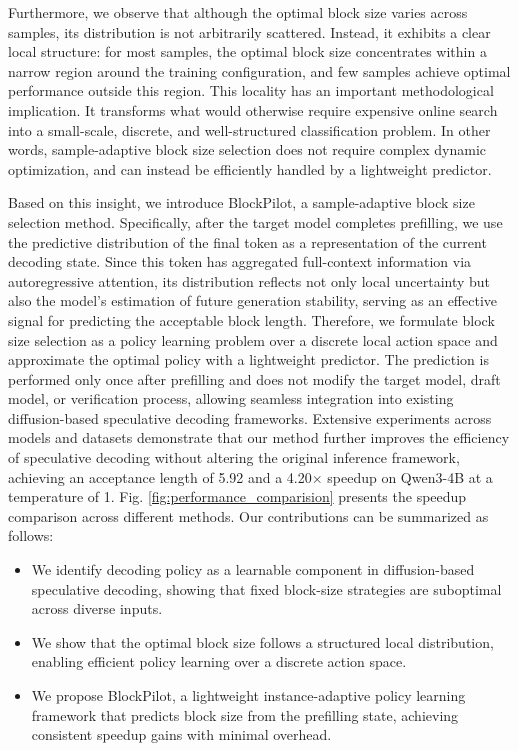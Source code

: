 \documentclass{article}
\begin{document}
Furthermore, we observe that although the optimal block size varies across samples, its distribution is not arbitrarily scattered. Instead, it exhibits a clear local structure: for most samples, the optimal block size concentrates within a narrow region around the training configuration, and few samples achieve optimal performance outside this region. This locality has an important methodological implication. It transforms what would otherwise require expensive online search into a small-scale, discrete, and well-structured classification problem. In other words, sample-adaptive block size selection does not require complex dynamic optimization, and can instead be efficiently handled by a lightweight predictor.

Based on this insight, we introduce BlockPilot, a sample-adaptive block size selection method. Specifically, after the target model completes prefilling, we use the predictive distribution of the final token as a representation of the current decoding state. Since this token has aggregated full-context information via autoregressive attention, its distribution reflects not only local uncertainty but also the model’s estimation of future generation stability, serving as an effective signal for predicting the acceptable block length. Therefore, we formulate block size selection as a policy learning problem over a discrete local action space and approximate the optimal policy with a lightweight predictor. The prediction is performed only once after prefilling and does not modify the target model, draft model, or verification process, allowing seamless integration into existing diffusion-based speculative decoding frameworks. Extensive experiments across models and datasets demonstrate that our method further improves the efficiency of speculative decoding without altering the original inference framework, achieving an acceptance length of 5.92 and a 4.20$\times$ speedup on Qwen3-4B at a temperature of 1. Fig. \ref{fig:performance_comparision} presents the speedup comparison across different methods. Our contributions can be summarized as follows:
\begin{itemize}[leftmargin=*]
    \item We identify decoding policy as a learnable component in diffusion-based speculative decoding, showing that fixed block-size strategies are suboptimal across diverse inputs.
    \item We show that the optimal block size follows a structured local distribution, enabling efficient policy learning over a discrete action space.
    \item We propose BlockPilot, a lightweight instance-adaptive policy learning framework that predicts block size from the prefilling state, achieving consistent speedup gains with minimal overhead.
\end{itemize}
\end{document}
